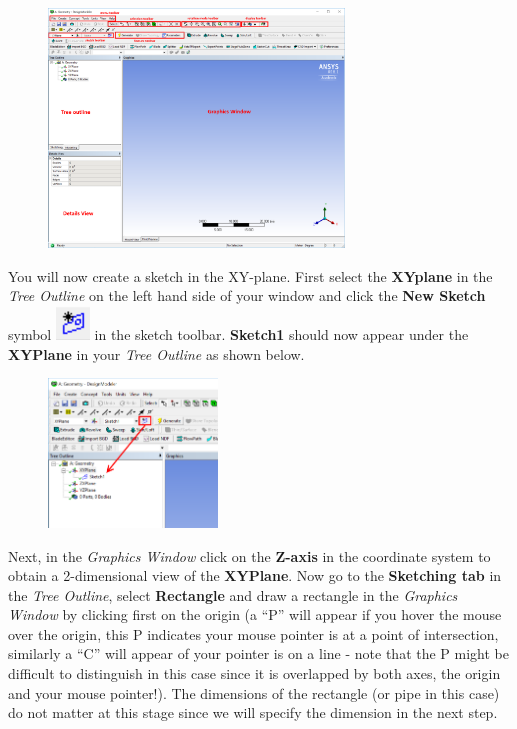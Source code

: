 \documentclass[11pt,a4paper,oneside,hidelinks]{scrartcl}
\newcommand\bfr[1]{\textcolor[rgb]{1,0.00,0.00}{\textbf{\textsf{#1}}}}
\begin{document}
\begin{figure}[H]
\begin{center}
\includegraphics[width=0.7\textwidth,clip]{Designmodeller_GUI.png}
\end{center}
\end{figure}

You will now create a sketch in the XY-plane. First select the \bfr{XYplane} in the \emph{Tree Outline} on the left hand side of your window and click the \bfr{New Sketch} symbol \includegraphics[width=.4cm]{newsketch_symbol.png} in the sketch toolbar. \bfr{Sketch1} should now appear under the \bfr{XYPlane} in your \emph{Tree Outline} as shown below.
\begin{figure}[H]
\begin{center}
\includegraphics[width=0.4\textwidth,clip]{newsketch.png}
\end{center}
\end{figure}

Next, in the \emph{Graphics Window} click on the \bfr{Z-axis} in the coordinate system to obtain a 2-dimensional view of the \bfr{XYPlane}. Now go to the \bfr{Sketching tab} in the \emph{Tree Outline}, select \bfr{Rectangle} and draw a rectangle in the \emph{Graphics Window} by clicking first on the origin (a ``P'' will appear if you hover the mouse over the origin, this P indicates your mouse pointer is at a point of intersection, similarly a ``C'' will appear of your pointer is on a line - note that the P might be difficult to distinguish in this case since it is overlapped by both axes, the origin and your mouse pointer!). The dimensions of the rectangle (or pipe in this case) do not matter at this stage since we will specify the dimension in the next step.
\end{document}
